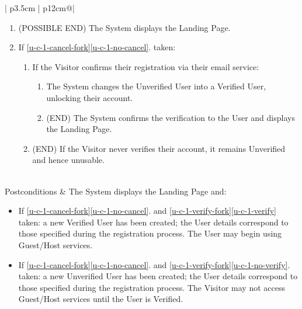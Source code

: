 \begin{table}[H]
\begin{tabular}{| p{3.5cm} | p{12cm}@\qquad |}
\begin{enumerate}
            \item\label{u-c-1-end} (POSSIBLE END) The System displays the Landing Page.

            \item If \ref{u-c-1-cancel-fork}\ref{u-c-1-no-cancel}. taken: \label{u-c-1-verify-fork}
            \begin{enumerate}
                \item \label{u-c-1-verify} If the Visitor confirms their registration via their email service:
                \begin{enumerate}
                    \item The System changes the Unverified User into a Verified User, unlocking their account.
                    \item (END) The System confirms the verification to the User and displays the Landing Page.
                \end{enumerate}
                \item \label{u-c-1-no-verify} (END) If the Visitor never verifies their account, it remains Unverified and hence unusable.
            \end{enumerate}
            \vspace{-0.4cm}
        \end{enumerate}
         \\ \hline
        Postconditions &
        The System displays the Landing Page and:
        \begin{itemize}
            \item If \ref{u-c-1-cancel-fork}\ref{u-c-1-no-cancel}. and \ref{u-c-1-verify-fork}\ref{u-c-1-verify} taken: a new Verified User has been created; the User details correspond to those specified during the registration process. The User may begin using Guest/Host services.
            \item If \ref{u-c-1-cancel-fork}\ref{u-c-1-no-cancel}. and \ref{u-c-1-verify-fork}\ref{u-c-1-no-verify}. taken: a new Unverified User has been created; the User details correspond to those specified during the registration process. The Visitor may not access Guest/Host services until the User is Verified.
            \vspace{-0.4cm}
        \end{itemize}
        \\ \hline
    \end{tabular}
    \caption{Use Case U-C-1: Register User}
    \label{use_case_u-c-1}
  \end{table}

